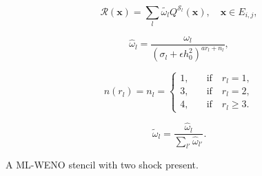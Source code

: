 \documentclass[usenames,dvipsnames,letterpaper,landscape,final]{slides}
\begin{document}
\begin{myslide}

		  \parbox{0.4\textwidth}{\raggedright
		  \begin{equation*}\label{eq:reconstruction}
\mathcal{R}(\mathbf{x}) = \sum_{l} \tilde{\omega_l} Q^{\mathcal{S}_l}(\mathbf{x}), \quad \mathbf{x} \in E_{i,j},
		  \end{equation*}

		  \begin{equation*}\label{eq:nonlinearwgts}
\hat{\omega}_l = \frac{\omega_l}{(\sigma_l + \epsilon h_0^2)^{ar_l + n_l}},
		  \end{equation*}

		  \begin{equation*}\label{eq:biasingfctor}
n(r_l) = n_l = \begin{cases}
1, \quad &\text{if} \quad r_l = 1,\\
3, \quad &\text{if} \quad r_l = 2,\\
4, \quad &\text{if} \quad r_l \geq 3.
\end{cases}
		  \end{equation*}

		  \begin{equation*}\label{eq:normalizednonlinearwgts}
\tilde{\omega}_l = \frac{\hat{\omega}_l}{\sum_{l'} \hat{\omega}_{l'}}.
		  \end{equation*}
		  }\parbox{0.6\textwidth}{
\centering


		  A  ML-WENO stencil with two shock present.

		  }
\end{myslide}
\end{document}

